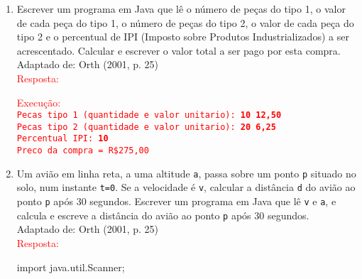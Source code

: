 \documentclass[onecolumn,a4paper,10pt]{report}
\newcommand{\+}{\, + \,}
\newcommand{\<}{\hspace*{-0.4cm}}
\begin{document}
\begin{enumerate}[1.]
\item Escrever um programa em Java que lê o número de peças do tipo 1, o valor de cada peça do tipo 1, o número de peças do tipo 2, o valor de cada peça do tipo 2 e o percentual de IPI (Imposto sobre Produtos Industrializados) a ser acrescentado. Calcular e escrever o valor total a ser pago por esta compra.\\
{\tiny Adaptado de: Orth (2001, p. 25)}\\
\textcolor{red}{Resposta:}\\
\textcolor{red}{Execução:\\
\texttt{Pecas tipo 1 (quantidade e valor unitario): \textbf{10 12,50}\\
Pecas tipo 2 (quantidade e valor unitario): \textbf{20 6,25}\\
Percentual IPI: \textbf{10}\\
Preco da compra = R\$275,00}
}

\item Um avião em linha reta, a uma altitude \texttt{a}, passa sobre um ponto \texttt{p} situado no solo, num instante \texttt{t=0}. Se a velocidade é \texttt{v}, calcular a distância \texttt{d} do avião ao ponto \texttt{p} após 30 segundos. Escrever um programa em Java que lê \texttt{v} e \texttt{a}, e calcula e escreve a distância do avião ao ponto \texttt{p} após 30 segundos.\\
{\tiny Adaptado de: Orth (2001, p. 25)}\\
\textcolor{red}{Resposta:}\\
\begin{javacode}
import java.util.Scanner;


\end{javacode}
\end{enumerate}
\end{document}
